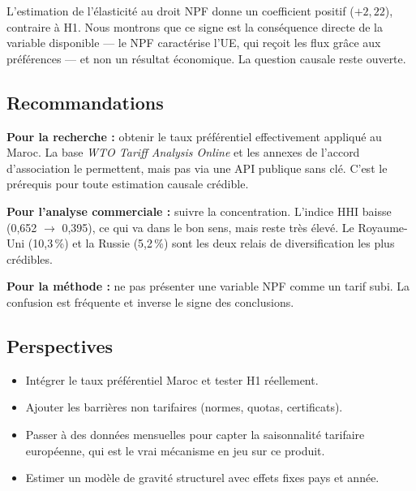 \documentclass[11pt,a4paper]{article}
\begin{document}
L'estimation de l'élasticité au droit NPF donne un coefficient positif
($+2{,}22$), contraire à H1. Nous montrons que ce signe est la conséquence directe de
la variable disponible — le NPF caractérise l'UE, qui reçoit les flux grâce aux
préférences — et non un résultat économique. La question causale reste ouverte.

\subsection{Recommandations}

\textbf{Pour la recherche :} obtenir le taux préférentiel effectivement appliqué au
Maroc. La base \emph{WTO Tariff Analysis Online} et les annexes de l'accord
d'association le permettent, mais pas via une API publique sans clé. C'est le
prérequis pour toute estimation causale crédible.

\textbf{Pour l'analyse commerciale :} suivre la concentration. L'indice HHI baisse
(0,652 $\rightarrow$ 0,395), ce qui va dans le bon sens, mais reste très élevé. Le
Royaume-Uni (10,3\,\%) et la Russie (5,2\,\%) sont les deux relais de diversification
les plus crédibles.

\textbf{Pour la méthode :} ne pas présenter une variable NPF comme un tarif subi. La
confusion est fréquente et inverse le signe des conclusions.

\subsection{Perspectives}

\begin{itemize}[leftmargin=1.2cm]
    \item Intégrer le taux préférentiel Maroc et tester H1 réellement.
    \item Ajouter les barrières non tarifaires (normes, quotas, certificats).
    \item Passer à des données mensuelles pour capter la saisonnalité tarifaire
          européenne, qui est le vrai mécanisme en jeu sur ce produit.
    \item Estimer un modèle de gravité structurel avec effets fixes pays et année.
\end{itemize}
\end{document}
